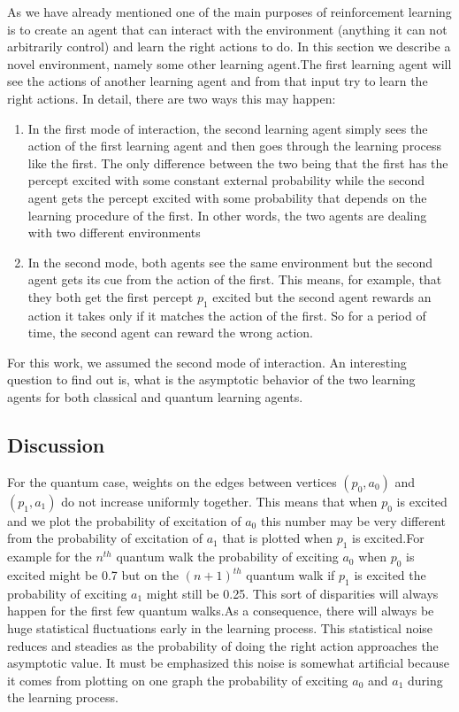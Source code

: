 \documentclass[twocolumn,prX,longbibliography]{revtex4}
\begin{document}
As we have already mentioned one of the main purposes of reinforcement learning is to create an agent that can interact with the environment (anything it can not arbitrarily control) and learn the right actions to do. In this section we describe a novel environment, namely some other learning agent.The first learning agent will see the actions of another learning agent and from that input try to learn the right actions. In detail, there are two ways this may happen:
\begin{enumerate}
 \item In the first mode of interaction, the second learning agent simply sees the action of the first learning agent and then goes through the learning process like the first. The only difference between the two being that the first has the percept excited with some constant external probability while the second  agent gets the percept excited with some probability that depends on the learning procedure of the first. In other words, the two agents are dealing with two different environments
 
 \item In the second mode, both agents see the same environment but the second agent gets its cue from the action of the first. This means, for example, that they both get the first percept \(p_1\) excited but the second agent rewards an action it takes only if it matches the action of the first. So for a period of time, the second agent can reward the wrong action. 

\end{enumerate}

 For this work, we assumed the second mode of interaction. An interesting question to find out is, what is the asymptotic behavior of the two learning agents for both classical and quantum learning agents.
 
 \subsection*{Discussion}
 For the quantum case, weights on the edges between vertices \((p_0, a_0) \) and \((p_1, a_1) \) do not increase uniformly together. This means that when \(p_0 \) is excited and we plot the probability of excitation of \(a_0 \) this number may be very different from the probability of excitation of \(a_1\) that is plotted when \(p_1 \) is excited.For example for the \(n^{th}\) quantum walk the probability of exciting \(a_0\) when \(p_0\) is excited might be 0.7  but on the \( (n+1)^{th}\) quantum walk if \(p_1\) is excited the probability of exciting \(a_1 \) might still be 0.25. This sort of disparities will always happen for the first few quantum walks.As a consequence, there will always be huge statistical fluctuations early in the learning process. This statistical noise reduces and steadies as the probability of doing the right action approaches the asymptotic value. It must be emphasized this noise is somewhat artificial because it comes from plotting on one graph the probability of exciting \(a_0 \) and \(a_1\) during the learning process. \newline
 
\end{document}

